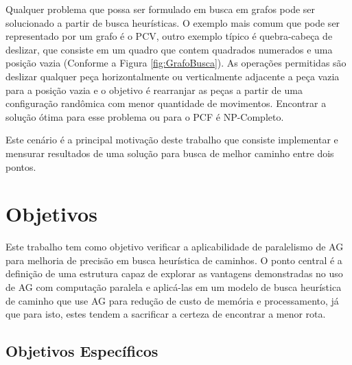 Qualquer problema que possa ser formulado em busca em grafos pode ser solucionado a partir de busca heurísticas. O exemplo mais comum que pode ser representado por um grafo é o PCV, outro exemplo típico é quebra-cabeça de deslizar, que consiste em um quadro que contem quadrados numerados e uma posição vazia (Conforme a Figura \ref{fig:GrafoBusca}). As operações permitidas são deslizar qualquer peça horizontalmente ou verticalmente adjacente a peça vazia para a posição vazia e o objetivo é rearranjar as peças a partir de uma configuração randômica com menor quantidade de movimentos. Encontrar a solução ótima para esse problema ou para o PCF é NP-Completo. \cite{Kar72} \cite{RatnerW86}

\begin{minipage}{\linewidth}
    \label{fig:slide-puzzle}
\end{minipage}

Este cenário é a principal motivação deste trabalho que consiste implementar e mensurar resultados de uma solução para busca de melhor caminho entre dois pontos.

\section{Objetivos}

Este trabalho tem como objetivo verificar a aplicabilidade de paralelismo de AG para melhoria de precisão em busca heurística de caminhos. O ponto central é a definição de uma estrutura capaz de explorar as vantagens demonstradas no uso de AG com computação paralela e aplicá-las em um modelo de busca heurística de caminho que use AG para redução de custo de memória e processamento, já que para isto, estes tendem a sacrificar a certeza de encontrar a menor rota. 

\subsection{Objetivos Específicos}

